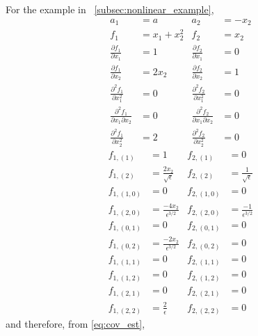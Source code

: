 For the example in \sec~\ref{subsec:nonlinear_example}, 
\begin{equation}
\begin{aligned}
a_1 &= a 
&
a_2 &= -x_2
\\
f_1 &= x_1 + x_2^2 
&
f_2 &= x_2 
\\
\frac{\partial f_1}{\partial x_1} &= 1
&
\frac{\partial f_2}{\partial x_1} &= 0 
\\
\frac{\partial f_1}{\partial x_2} &= 2 x_2
&
\frac{\partial f_2}{\partial x_2} &= 1 
\\
\frac{\partial^2 f_1}{\partial x_1^2} &= 0
&
\frac{\partial^2 f_2}{\partial x_1^2} &= 0
\\
\frac{\partial^2 f_1}{\partial x_1 \partial x_2} &= 0
&
\frac{\partial^2 f_2}{\partial x_1 \partial x_2} &= 0
\\
\frac{\partial^2 f_1}{\partial x_2^2 } &= 2
&
\frac{\partial^2 f_2}{\partial x_2^2} &= 0
\end{aligned}
\end{equation}
%
\begin{equation}
\begin{aligned}
f_{1,(1)} &= 1
&
f_{2,(1)} &= 0
\\
f_{1,(2)} &= \frac{2 x_2}{\sqrt{\epsilon}}
&
f_{2,(2)} &= \frac{1}{\sqrt{\epsilon}}
\\
f_{1,(1,0)} &= 0
&
f_{2,(1,0)} &= 0
\\
f_{1,(2,0)} &= \frac{-4 x_2}{\epsilon^{3/2}} 
&
f_{2,(2,0)} &= \frac{-1}{\epsilon^{3/2}}
\\
f_{1,(0,1)} &= 0
&
f_{2,(0,1)} &= 0
\\
f_{1,(0,2)} &= \frac{-2 x_2}{\epsilon^{3/2}} 
&
f_{2,(0,2)} &= 0
\\
f_{1,(1,1)} &= 0
&
f_{2,(1,1)} &= 0
\\
f_{1,(1,2)} &= 0
&
f_{2,(1,2)} &= 0
\\
f_{1,(2,1)} &= 0
&
f_{2,(2,1)} &= 0
\\
f_{1,(2,2)} &= \frac{2}{\epsilon}
&
f_{2,(2,2)} &= 0
\end{aligned}
\end{equation}
%
and therefore, from \eqref{eq:cov_est}, 
%

